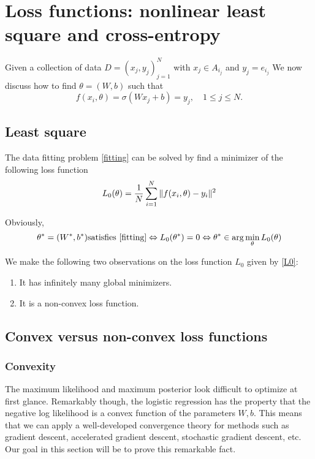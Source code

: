 \section{Loss functions:  nonlinear least square and cross-entropy}
Given a collection of data $D=(x_j,y_j)_{j=1}^N$ with $x_j\in A_{i_j}$
and $y_j=e_{i_j}$ We now discuss how to find $\theta =(W,b)$ such that
\begin{equation}
\label{fitting}
f(x_i,\theta)=\sigma(Wx_j+b)=y_j,\quad 1\le j \le N.
\end{equation}

\subsection{Least square}
The data fitting problem \eqref{fitting} can be solved by find a minimizer of the following loss function
\begin{equation}
\label{L0}
L_0(\theta)={1\over N}\sum_{i=1}^N\|f(x_i,\theta)-y_i\|^2
\end{equation}

Obviously,
$$
\theta^*=(W^*,b^*) \mathrm{satisfies}\ \eqref{fitting} \Leftrightarrow L_0(\theta^*)=0\Leftrightarrow \theta^*\in\arg\min_{\theta}L_0(\theta)
$$

We make the  following two observations on the loss function $L_0$ given by \eqref{L0}:
\begin{enumerate}
	\item It has infinitely many global minimizers.
	\item It is a non-convex loss function.
\end{enumerate}





\subsection{Convex versus non-convex loss functions}
\subsubsection{Convexity}
The maximum likelihood and maximum posterior look difficult to optimize at first glance. Remarkably though,
the logistic regression has the property that the negative log likelihood is a convex function of the parameters $W,b$.
This means that we can apply a well-developed convergence theory for methods such as gradient descent, accelerated gradient
descent, stochastic gradient descent, etc. Our goal in this section will be to prove this remarkable fact.

